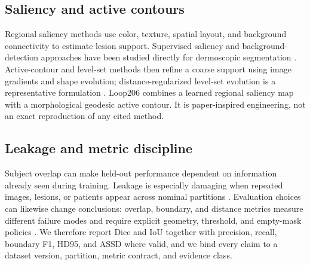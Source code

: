 \subsection{Saliency and active contours}

Regional saliency methods use color, texture, spatial layout, and background connectivity to estimate lesion support. Supervised saliency and background-detection approaches have been studied directly for dermoscopic segmentation \citep{jahanifar2019saliency,ahn2017background}. Active-contour and level-set methods then refine a coarse support using image gradients and shape evolution; distance-regularized level-set evolution is a representative formulation \citep{li2010drlse}. Loop206 combines a learned regional saliency map with a morphological geodesic active contour. It is paper-inspired engineering, not an exact reproduction of any cited method.

\subsection{Leakage and metric discipline}

Subject overlap can make held-out performance dependent on information already seen during training. Leakage is especially damaging when repeated images, lesions, or patients appear across nominal partitions \citep{kapoor2023leakage}. Evaluation choices can likewise change conclusions: overlap, boundary, and distance metrics measure different failure modes and require explicit geometry, threshold, and empty-mask policies \citep{maierhein2024metrics}. We therefore report Dice and IoU together with precision, recall, boundary F1, HD95, and ASSD where valid, and we bind every claim to a dataset version, partition, metric contract, and evidence class.
